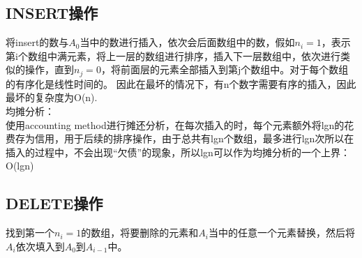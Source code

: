 \documentclass[UTF8]{ctexart}
\begin{document}
\subsection{INSERT操作}
将insert的数与$A_0$当中的数进行插入，依次会后面数组中的数，假如$n_i=1$，表示第i个数组中满元素，将上一层的数组进行排序，插入下一层数组中，依次进行类似的操作，直到$n_j = 0$，将前面层的元素全部插入到第j个数组中。对于每个数组的有序化是线性时间的。
因此在最坏的情况下，有n个数字需要有序的插入，因此最坏的复杂度为O(n).\\

均摊分析：\\
使用accounting method进行摊还分析，在每次插入的时，每个元素额外将lgn的花费存为信用，用于后续的排序操作，由于总共有lgn个数组，最多进行lgn次所以在插入的过程中，不会出现“欠债”的现象，所以lgn可以作为均摊分析的一个上界：O(lgn)

\subsection{DELETE操作}
找到第一个$n_i=1$的数组，将要删除的元素和$A_i$当中的任意一个元素替换，然后将$A_i$依次填入到$A_0$到$A_{i-1}$中。
\end{document}

